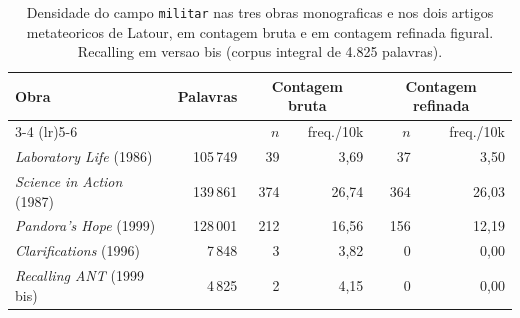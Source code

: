 \begin{table}[htbp]
\centering
\caption[Campo militar refinado, 5 obras de Latour (Etapa 2-bis)]{Densidade do campo \texttt{militar} nas tres obras monograficas e nos dois artigos metateoricos de Latour, em contagem bruta e em contagem refinada figural. Recalling em versao bis (corpus integral de 4.825 palavras).}
\label{tab:militar-refinado-5-obras-bis}
\small
\begin{tabular}{lrrrrr}
\toprule
Obra & Palavras & \multicolumn{2}{c}{Contagem bruta} & \multicolumn{2}{c}{Contagem refinada} \\
\cmidrule(lr){3-4} \cmidrule(lr){5-6}
 & & $n$ & freq./10k & $n$ & freq./10k \\
\midrule
\emph{Laboratory Life} (1986) & 105\,749 & 39 & 3{,}69 & 37 & 3{,}50 \\
\emph{Science in Action} (1987) & 139\,861 & 374 & 26{,}74 & 364 & 26{,}03 \\
\emph{Pandora's Hope} (1999) & 128\,001 & 212 & 16{,}56 & 156 & 12{,}19 \\
\midrule
\emph{Clarifications} (1996) & 7\,848 & 3 & 3{,}82 & 0 & 0{,}00 \\
\emph{Recalling ANT} (1999\, bis) & 4\,825 & 2 & 4{,}15 & 0 & 0{,}00 \\
\bottomrule
\end{tabular}
\end{table}

